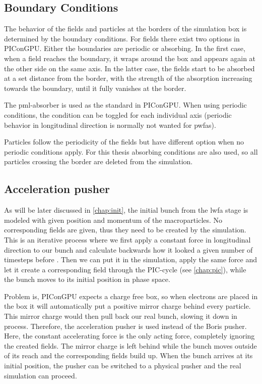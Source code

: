 \documentclass[bachelor_thesis]{subfiles}
\begin{document}
\subsection{Boundary Conditions}
The behavior of the fields and particles at the borders of the simulation box is determined by the boundary conditions.
For fields there exist two options in PIConGPU. Either the boundaries are periodic or absorbing. In the first case, when a field reaches the boundary, it wraps around the box and appears again at the other side on the same axis.
In the latter case, the fields start to be absorbed at a set distance from the border, with the strength of the absorption increasing towards the boundary, until it fully vanishes at the border.

The \gls{pml}-absorber is used as the standard in PIConGPU. When using periodic conditions, the condition can be toggled for each individual axis (periodic behavior in longitudinal direction is normally not wanted for \gls{pwfa}s).

Particles follow the periodicity of the fields but have different option when no periodic conditions apply. For this thesis absorbing conditions are also used, so all particles crossing the border are deleted from the simulation.

\subsection{Acceleration pusher} \label{chap:accpush}
As will be later discussed in \autoref{chap:init}, the initial bunch from the \gls{lwfa} stage is modeled with given position and momentum of the macroparticles.
No corresponding fields are given, thus they need to be created by the simulation. This is an iterative process where we first apply a constant force in longitudinal direction to our bunch and calculate backwards how it looked a given number of timesteps before \cite{Huebl2014}.
Then we can put it in the simulation, apply the same force and let it create a corresponding field through the PIC-cycle (see \autoref{chap:pic}), while the bunch moves to its initial position in phase space.

Problem is, PIConGPU expects a charge free box, so when electrons are placed in the box it will automatically put a positive mirror charge behind every particle. This mirror charge would then pull back our real 
bunch, slowing it down in process. Therefore, the acceleration pusher is used instead of the Boris pusher. Here, the constant accelerating force is the only acting force, completely ignoring the created fields.
The mirror charge is left behind while the bunch moves outside of its reach and the corresponding fields build up. When the bunch arrives at its initial position, the pusher can be switched to a physical pusher and
the real simulation can proceed.
\end{document}
